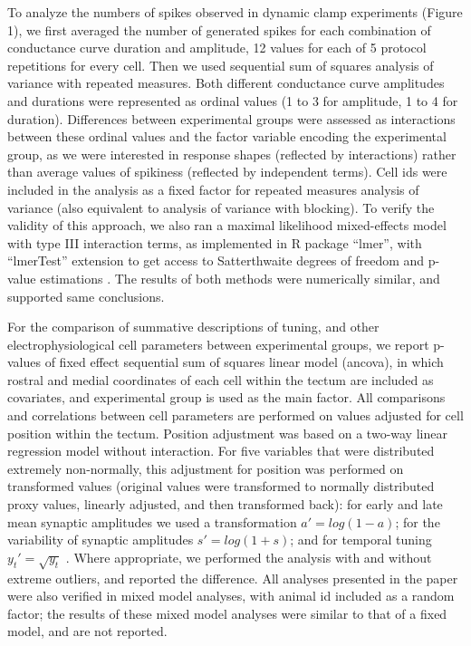 \documentclass{article}
\begin{document}
To analyze the numbers of spikes observed in dynamic clamp experiments (Figure 1), we first averaged the number of generated spikes for each combination of conductance curve duration and amplitude, 12 values for each of 5 protocol repetitions for every cell. Then we used sequential sum of squares analysis of variance with repeated measures. Both different conductance curve amplitudes and durations were represented as ordinal values (1 to 3 for amplitude, 1 to 4 for duration). Differences between experimental groups were assessed as interactions between these ordinal values and the factor variable encoding the experimental group, as we were interested in response shapes (reflected by interactions) rather than average values of spikiness (reflected by independent terms). Cell ids were included in the analysis as a fixed factor for repeated measures analysis of variance (also equivalent to analysis of variance with blocking). To verify the validity of this approach, we also ran a maximal likelihood mixed-effects model with type III interaction terms, as implemented in R package “lmer”, with “lmerTest” extension to get access to Satterthwaite degrees of freedom and p-value estimations \citep{kuznetsova2017}. The results of both methods were numerically similar, and supported same conclusions.

For the comparison of summative descriptions of tuning, and other electrophysiological cell parameters between experimental groups, we report p-values of fixed effect sequential sum of squares linear model (ancova), in which rostral and medial coordinates of each cell within the tectum are included as covariates, and experimental group is used as the main factor. All comparisons and correlations between cell parameters are performed on values adjusted for cell position within the tectum. Position adjustment was based on a two-way linear regression model without interaction. For five variables that were distributed extremely non-normally, this adjustment for position was performed on transformed values (original values were transformed to normally distributed proxy values, linearly adjusted, and then transformed back): for early and late mean synaptic amplitudes we used a transformation $a'=log(1-a)$; for the variability of synaptic amplitudes $s'=log(1+s)$; and for temporal tuning $y_t' = \sqrt{y_t}$ . Where appropriate, we performed the analysis with and without extreme outliers, and reported the difference. All analyses presented in the paper were also verified in mixed model analyses, with animal id included as a random factor; the results of these mixed model analyses were similar to that of a fixed model, and are not reported.

\nolinenumbers




\end{document}
